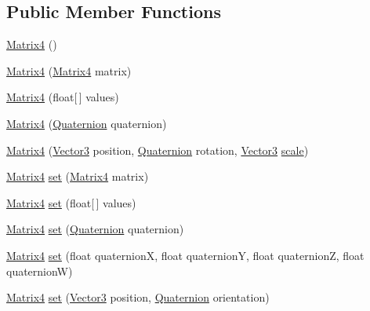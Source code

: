 \subsection*{Public Member Functions}
\begin{DoxyCompactItemize}
\item 
\hyperlink{classairhockeyjava_1_1util_1_1_matrix4_a4f85872fcbb4cdb2813cb639e3df5701}{Matrix4} ()
\item 
\hyperlink{classairhockeyjava_1_1util_1_1_matrix4_a291a46fc425f71799f09e326990505ee}{Matrix4} (\hyperlink{classairhockeyjava_1_1util_1_1_matrix4}{Matrix4} matrix)
\item 
\hyperlink{classairhockeyjava_1_1util_1_1_matrix4_acc887ee9858a22abb74e2d0836ee8134}{Matrix4} (float\mbox{[}$\,$\mbox{]} values)
\item 
\hyperlink{classairhockeyjava_1_1util_1_1_matrix4_a9a70109aa1351cc97bead97fea90731e}{Matrix4} (\hyperlink{classairhockeyjava_1_1util_1_1_quaternion}{Quaternion} quaternion)
\item 
\hyperlink{classairhockeyjava_1_1util_1_1_matrix4_a4fc62832f9f4575f28532c2e27c0c799}{Matrix4} (\hyperlink{classairhockeyjava_1_1util_1_1_vector3}{Vector3} position, \hyperlink{classairhockeyjava_1_1util_1_1_quaternion}{Quaternion} rotation, \hyperlink{classairhockeyjava_1_1util_1_1_vector3}{Vector3} \hyperlink{classairhockeyjava_1_1util_1_1_matrix4_a6c40d2aa19b65cdc8749121b126a6940}{scale})
\item 
\hyperlink{classairhockeyjava_1_1util_1_1_matrix4}{Matrix4} \hyperlink{classairhockeyjava_1_1util_1_1_matrix4_a5f756eb57a6f4c03d31a2d96d9f80988}{set} (\hyperlink{classairhockeyjava_1_1util_1_1_matrix4}{Matrix4} matrix)
\item 
\hyperlink{classairhockeyjava_1_1util_1_1_matrix4}{Matrix4} \hyperlink{classairhockeyjava_1_1util_1_1_matrix4_ae7b21a3884681c6ce8048758ef2b2002}{set} (float\mbox{[}$\,$\mbox{]} values)
\item 
\hyperlink{classairhockeyjava_1_1util_1_1_matrix4}{Matrix4} \hyperlink{classairhockeyjava_1_1util_1_1_matrix4_a691ea6dba3ad95812495873a4c4da5c7}{set} (\hyperlink{classairhockeyjava_1_1util_1_1_quaternion}{Quaternion} quaternion)
\item 
\hyperlink{classairhockeyjava_1_1util_1_1_matrix4}{Matrix4} \hyperlink{classairhockeyjava_1_1util_1_1_matrix4_a5dcac8961ed70942a8a72fdbada4fdbe}{set} (float quaternion\+X, float quaternion\+Y, float quaternion\+Z, float quaternion\+W)
\item 
\hyperlink{classairhockeyjava_1_1util_1_1_matrix4}{Matrix4} \hyperlink{classairhockeyjava_1_1util_1_1_matrix4_a77a6a6edf925e9369a3c8ee7958c86df}{set} (\hyperlink{classairhockeyjava_1_1util_1_1_vector3}{Vector3} position, \hyperlink{classairhockeyjava_1_1util_1_1_quaternion}{Quaternion} orientation)

\end{DoxyCompactItemize}
